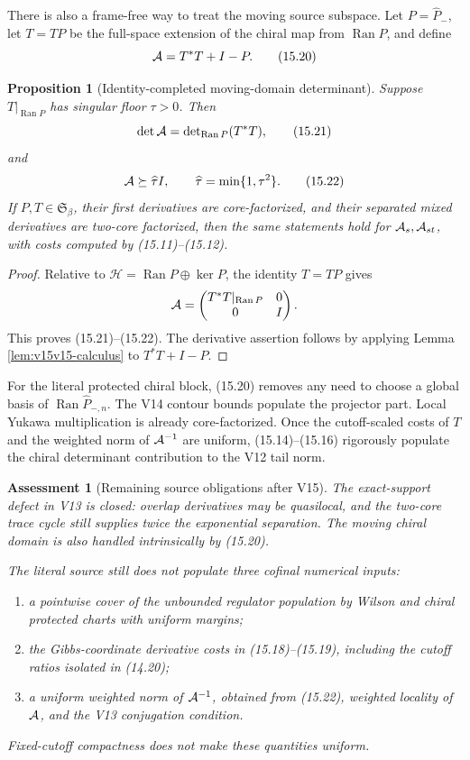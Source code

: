 \documentclass[11pt]{article}
\newtheorem{proposition}[theorem]{Proposition}
\newtheorem{assessment}[theorem]{Assessment}
\theoremstyle{remark}
\begin{document}
There is also a frame-free way to treat the moving source subspace.
Let \(P=\widehat P_-\), let \(T=TP\) be the full-space extension of
the chiral map from \(\operatorname{Ran}P\), and define
\[
 {\cal A}=T^*T+I-P.                                         \tag{15.20}
\]

\begin{proposition}[Identity-completed moving-domain determinant]
\label{prop:v15v15-completion}
Suppose \(T|_{\operatorname{Ran}P}\) has singular floor \(\tau>0\).
Then
\[
 \det{\cal A}
 =
 \det\nolimits_{\operatorname{Ran}P}(T^*T),                 \tag{15.21}
\]
and
\[
 {\cal A}\succeq \widehat\tau I,\qquad
 \widehat\tau=\min\{1,\tau^2\}.                             \tag{15.22}
\]
If \(P,T\in\mathfrak S_\beta\), their first derivatives are
core-factorized, and their separated mixed derivatives are
two-core factorized, then the same statements hold for
\({\cal A}_s,{\cal A}_{st}\), with costs computed by
(15.11)--(15.12).
\end{proposition}

\begin{proof}
Relative to
\(\mathcal H=\operatorname{Ran}P\oplus\ker P\), the identity
\(T=TP\) gives
\[
 {\cal A}
 =
 \begin{pmatrix}
 T^*T|_{\operatorname{Ran}P}&0\\
 0&I
 \end{pmatrix}.
\]
This proves (15.21)--(15.22).  The derivative assertion follows by
applying Lemma \ref{lem:v15v15-calculus} to
\(T^*T+I-P\).
\end{proof}

For the literal protected chiral block, (15.20) removes any need to
choose a global basis of \(\operatorname{Ran}\widehat P_{-,n}\).
The V14 contour bounds populate the projector part.  Local Yukawa
multiplication is already core-factorized.  Once the cutoff-scaled
costs of \(T\) and the weighted norm of \({\cal A}^{-1}\) are
uniform, (15.14)--(15.16) rigorously populate the chiral
determinant contribution to the V12 tail norm.

\begin{assessment}[Remaining source obligations after V15]
\label{ass:v15v15-source}
The exact-support defect in V13 is closed: overlap derivatives may
be quasilocal, and the two-core trace cycle still supplies twice
the exponential separation.  The moving chiral domain is also
handled intrinsically by (15.20).

The literal source still does not populate three cofinal numerical
inputs:
\begin{enumerate}
\item a pointwise cover of the unbounded regulator population by
      Wilson and chiral protected charts with uniform margins;
\item the Gibbs-coordinate derivative costs in (15.18)--(15.19),
      including the cutoff ratios isolated in (14.20);
\item a uniform weighted norm of \({\cal A}^{-1}\), obtained from
      (15.22), weighted locality of \({\cal A}\), and the V13
      conjugation condition.
\end{enumerate}
Fixed-cutoff compactness does not make these quantities uniform.
\end{assessment}
\end{document}
